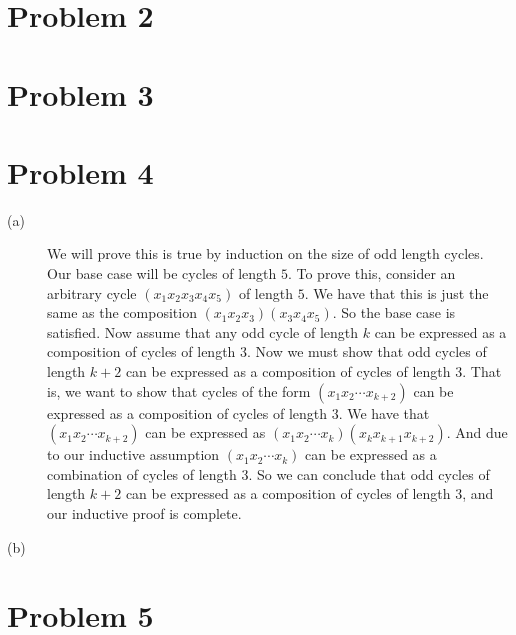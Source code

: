 \documentclass{article}
\begin{document}
\section*{Problem 2}

\section*{Problem 3}

\section*{Problem 4}
\begin{description}
    \item[(a)] We will prove this is true by induction on the size of odd
        length cycles. Our base case will be cycles of length $5$. To
        prove this, consider an arbitrary cycle $(x_1x_2x_3x_4x_5)$ of
        length $5$. We have that this is just the same as the composition
        $(x_1x_2x_3)(x_3x_4x_5)$. So the base case is satisfied. Now assume
        that any odd cycle of length $k$ can be expressed as a composition of
        cycles of length $3$. Now we must show that odd cycles of length
        $k+2$ can be expressed as a composition of cycles of length $3$.
        That is, we want to show that cycles of the form $(x_1x_2\cdots x_{k+2})$
        can be expressed as a composition of cycles of length $3$. We have that
        $(x_1x_2\cdots x_{k+2})$ can be expressed as
        $(x_1x_2\cdots x_k)(x_kx_{k+1}x_{k+2})$. And due to our inductive
        assumption $(x_1x_2\cdots x_k)$ can be expressed as a combination of
        cycles of length $3$. So we can conclude that odd cycles of length
        $k+2$ can be expressed as a composition of cycles of length $3$, and
        our inductive proof is complete.
    \item[(b)]
\end{description}

\section*{Problem 5}
\end{document}
